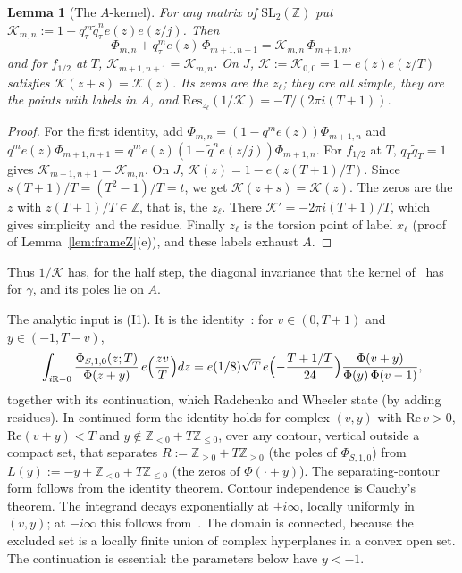 \documentclass[11pt]{amsart}
\numberwithin{equation}{section}
\theoremstyle{plain}
\newtheorem{lemma}[theorem]{Lemma}
\theoremstyle{definition}
\theoremstyle{remark}
\begin{document}
\begin{lemma}[The \(A\)-kernel]\label{lem:Akernel}
For any matrix of \(\mathrm{SL}_2(\mathbb Z)\) put \(\mathcal K_{m,n}:=1-q_\tau^m\tilde q_\tau^ne(z)e(z/j)\). Then
\[\Phi_{m,n}+q_\tau^me(z)\,\Phi_{m+1,n+1}=\mathcal K_{m,n}\,\Phi_{m+1,n},\]
and for \(f_{1/2}\) at \(T\), \(\mathcal K_{m+1,n+1}=\mathcal K_{m,n}\). On \(J\), \(\mathcal K:=\mathcal K_{0,0}=1-e(z)e(z/T)\) satisfies \(\mathcal K(z+s)=\mathcal K(z)\). Its zeros are the \(z_\ell\); they are all simple, they are the points with labels in \(A\), and \(\mathrm{Res}_{z_\ell}(1/\mathcal K)=-T/(2\pi i(T+1))\).
\end{lemma}

\begin{proof}
For the first identity, add \(\Phi_{m,n}=(1-q^me(z))\Phi_{m+1,n}\) and \(q^me(z)\Phi_{m+1,n+1}=q^me(z)(1-\tilde q^ne(z/j))\Phi_{m+1,n}\). For \(f_{1/2}\) at \(T\), \(q_T\tilde q_T=1\) gives \(\mathcal K_{m+1,n+1}=\mathcal K_{m,n}\). On \(J\), \(\mathcal K(z)=1-e(z(T+1)/T)\). Since \(s(T+1)/T=(T^2-1)/T=t\), we get \(\mathcal K(z+s)=\mathcal K(z)\). The zeros are the \(z\) with \(z(T+1)/T\in\mathbb Z\), that is, the \(z_\ell\). There \(\mathcal K'=-2\pi i(T+1)/T\), which gives simplicity and the residue. Finally \(z_\ell\) is the torsion point of label \(x_\ell\) (proof of Lemma~\ref{lem:frameZ}(e)), and these labels exhaust \(A\).
\end{proof}

Thus \(1/\mathcal K\) has, for the half step, the diagonal invariance that the kernel of~\cite{RW} has for \(\gamma\), and its poles lie on \(A\).

The analytic input is (I1). It is the identity~\cite[(15)]{RW}: for \(v\in(0,T+1)\) and \(y\in(-1,T-v)\),
\[\int_{i\mathbb R-0}\frac{\Phi_{S,1,0}(z;T)}{\Phi(z+y)}\,e\Bigl(\frac{zv}{T}\Bigr)dz=e(1/8)\sqrt T\,e\Bigl(-\frac{T+1/T}{24}\Bigr)\frac{\Phi(v+y)}{\Phi(y)\,\Phi(v-1)},\]
together with its continuation, which Radchenko and Wheeler state (by adding residues). In continued form the identity holds for complex \((v,y)\) with \(\mathrm{Re}\,v>0\), \(\mathrm{Re}(v+y)<T\) and \(y\notin\mathbb Z_{<0}+T\mathbb Z_{\le0}\), over any contour, vertical outside a compact set, that separates \(R:=\mathbb Z_{\ge0}+T\mathbb Z_{\ge0}\) (the poles of \(\Phi_{S,1,0}\)) from \(L(y):=-y+\mathbb Z_{<0}+T\mathbb Z_{\le0}\) (the zeros of \(\Phi(\cdot+y)\)). The separating-contour form follows from the identity theorem. Contour independence is Cauchy's theorem. The integrand decays exponentially at \(\pm i\infty\), locally uniformly in \((v,y)\); at \(-i\infty\) this follows from~\cite[(13)]{RW}. The domain is connected, because the excluded set is a locally finite union of complex hyperplanes in a convex open set. The continuation is essential: the parameters below have \(y<-1\).
\end{document}
